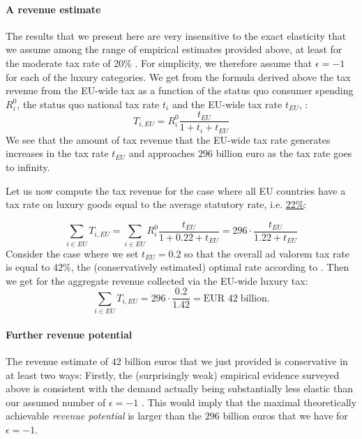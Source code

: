 \documentclass[../../main]{subfiles}
\begin{document}
\paragraph{A revenue estimate  } 
The results that we present here are very insensitive to the exact elasticity that we assume among the range of empirical estimates provided above, at least for the moderate tax rate of 20\% . For simplicity, we therefore assume that $\epsilon=-1$ for each of the luxury categories. We get from the formula derived above the tax revenue from the EU-wide tax as a function of the status quo consumer spending $R_i^0$, the status quo national tax rate $t_i$  and the EU-wide tax rate $t_{EU}$, :
\[
T_{i,EU}= R_i^0 \frac{t_{EU}}{1+t_i+t_{EU}}
\]
We see that the amount of tax revenue that the EU-wide tax rate generates increases in the tax rate $t_{EU}$ and approaches $296$ billion euro as the tax rate goes to infinity. 

Let us now compute the tax revenue for the case where all EU countries have a tax rate on luxury goods equal to the average statutory rate, i.e.  \hyperlink{https://taxfoundation.org/data/all/eu/value-added-tax-vat-rates-europe/}{22\%}:

\[
\sum_{i\in {EU}} T_{i,EU}= \sum_{i\in {EU}} R_i^0 \frac{t_{EU}}{1+0.22+t_{EU}}=  296 \cdot \frac{t_{EU}}{1.22+t_{EU}}
\]
Consider the case where we set $t_{EU}=0.2$ so that the overall ad valorem tax rate is equal to 42\%, the (conservatively estimated) optimal rate according to \citet{Xie2026}. Then we get for the aggregate revenue collected via the EU-wide luxury tax:
\[
\sum_{i\in {EU}} T_{i,EU}=  296 \cdot \frac{0.2}{1.42}= \text{EUR~}42\; \mathrm{billion}.
\]

\paragraph{Further revenue potential}
The revenue estimate of $42$ billion euros that we just provided is conservative in at least two ways: Firstly, the (surprisingly weak) empirical evidence surveyed above is consistent with the demand actually being substantially less elastic than our assumed number of $\epsilon=-1$ . This would imply that the maximal theoretically achievable \textit{revenue potential} is larger than the $296$ billion euros 
 that we have for $\epsilon =-1$. 
\end{document}
